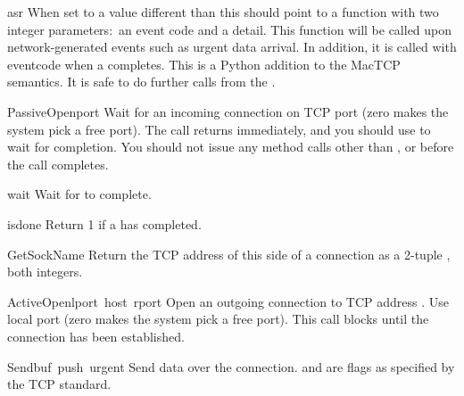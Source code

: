 \renewcommand{\indexsubitem}{(TCP stream attribute)}

\begin{datadesc}{asr}
When set to a value different than  this should point to a
function with two integer parameters:\ an event code and a detail. This
function will be called upon network-generated events such as urgent
data arrival. In addition, it is called with eventcode
 when a  completes. This
is a Python addition to the MacTCP semantics.
It is safe to do further calls from the .
\end{datadesc}

\renewcommand{\indexsubitem}{(TCP stream method)}

\begin{funcdesc}{PassiveOpen}{port}
Wait for an incoming connection on TCP port  (zero makes the
system pick a free port). The call returns immediately, and you should
use  to wait for completion. You should not issue any method
calls other than
,  or  before the call
completes.
\end{funcdesc}

\begin{funcdesc}{wait}{}
Wait for  to complete.
\end{funcdesc}

\begin{funcdesc}{isdone}{}
Return 1 if a  has completed.
\end{funcdesc}

\begin{funcdesc}{GetSockName}{}
Return the TCP address of this side of a connection as a 2-tuple
, both integers.
\end{funcdesc}

\begin{funcdesc}{ActiveOpen}{lport\, host\, rport}
Open an outgoing connection to TCP address . Use
local port  (zero makes the system pick a free port). This
call blocks until the connection has been established.
\end{funcdesc}

\begin{funcdesc}{Send}{buf\, push\, urgent}
Send data  over the connection.  and 
are flags as specified by the TCP standard.
\end{funcdesc}

